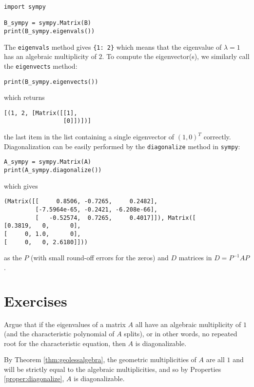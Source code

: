 \begin{lstlisting}
import sympy

B_sympy = sympy.Matrix(B)
print(B_sympy.eigenvals())
\end{lstlisting}
The \verb|eigenvals| method gives \verb|{1: 2}| which means that the eigenvalue of $\lambda = 1$ has an algebraic multiplicity of $2$. To compute the eigenvector(s), we similarly call the \verb|eigenvects| method:
\begin{lstlisting}
print(B_sympy.eigenvects())
\end{lstlisting}
which returns 
\begin{lstlisting}
[(1, 2, [Matrix([[1],
                 [0]])])]
\end{lstlisting}
the last item in the list containing a single eigenvector of $(1,0)^T$ correctly. Diagonalization can be easily performed by the \verb|diagonalize| method in \texttt{sympy}:
\begin{lstlisting}
A_sympy = sympy.Matrix(A)
print(A_sympy.diagonalize())
\end{lstlisting}
which gives
\begin{lstlisting}
(Matrix([[     0.8506, -0.7265,     0.2482],
         [-7.5964e-65, -0.2421, -6.208e-66],
         [   -0.52574,  0.7265,     0.4017]]), Matrix([
[0.3819,   0,      0],
[     0, 1.0,      0],
[     0,   0, 2.6180]]))
\end{lstlisting}
as the $P$ (with small round-off errors for the zeros) and $D$ matrices in $D = P^{-1}AP$.

\section{Exercises}

\begin{Exercise}
Argue that if the eigenvalues of a matrix $A$ all have an algebraic multiplicity of $1$ (and the characteristic polynomial of $A$ splits), or in other words, no repeated root for the characteristic equation, then $A$ is diagonalizable. 
\end{Exercise}
\begin{Answer}
By Theorem \ref{thm:geolessalgebra}, the geometric multiplicities of $A$ are all $1$ and will be strictly equal to the algebraic multiplicities, and so by Properties \ref{proper:diagonalize}, $A$ is diagonalizable.
\end{Answer}

